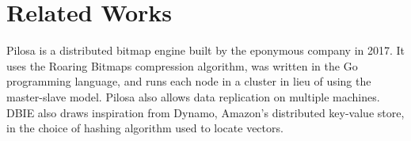 \section{Related Works}
Pilosa \cite{pilosa2017} is a distributed bitmap engine built by the eponymous company in
2017. It uses the Roaring Bitmaps compression algorithm, was written in the
Go programming language, and runs each node in a cluster in lieu of using
the master-slave model. Pilosa also allows data replication on multiple machines.
\\\indent DBIE also draws inspiration from Dynamo, Amazon's
distributed key-value store, in the choice of hashing algorithm used
to locate vectors.
